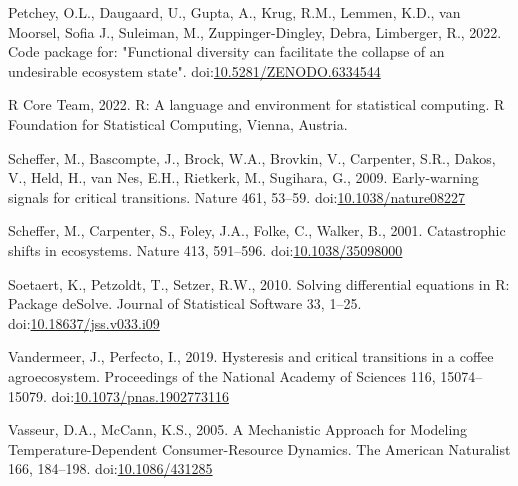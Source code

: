 \documentclass[
]{article}
\newlength{\cslhangindent}
\newlength{\cslentryspacingunit} %
\newenvironment{CSLReferences}[2] %
 {%
  \setlength{\parindent}{0pt}
  \ifodd #1
  \let\oldpar\par
  \def\par{\hangindent=\cslhangindent\oldpar}
  \fi
  \setlength{\parskip}{#2\cslentryspacingunit}
 }%
 {}
\begin{document}
\begin{CSLReferences}{1}{0}
\leavevmode{}%
Petchey, O.L., Daugaard, U., Gupta, A., Krug, R.M., Lemmen, K.D., van
Moorsel, Sofia J., Suleiman, M., Zuppinger-Dingley, Debra, Limberger,
R., 2022. Code package for: "{Functional} diversity can facilitate the
collapse of an undesirable ecosystem state".
doi:\href{https://doi.org/10.5281/ZENODO.6334544}{10.5281/ZENODO.6334544}

\leavevmode{}%
R Core Team, 2022. R: {A} language and environment for statistical
computing. {R Foundation for Statistical Computing}, {Vienna, Austria}.

\leavevmode{}%
Scheffer, M., Bascompte, J., Brock, W.A., Brovkin, V., Carpenter, S.R.,
Dakos, V., Held, H., van Nes, E.H., Rietkerk, M., Sugihara, G., 2009.
Early-warning signals for critical transitions. Nature 461, 53--59.
doi:\href{https://doi.org/10.1038/nature08227}{10.1038/nature08227}

\leavevmode{}%
Scheffer, M., Carpenter, S., Foley, J.A., Folke, C., Walker, B., 2001.
Catastrophic shifts in ecosystems. Nature 413, 591--596.
doi:\href{https://doi.org/10.1038/35098000}{10.1038/35098000}

\leavevmode{}%
Soetaert, K., Petzoldt, T., Setzer, R.W., 2010. Solving differential
equations in {R}: {Package deSolve}. Journal of Statistical Software 33,
1--25.
doi:\href{https://doi.org/10.18637/jss.v033.i09}{10.18637/jss.v033.i09}

\leavevmode{}%
Vandermeer, J., Perfecto, I., 2019. Hysteresis and critical transitions
in a coffee agroecosystem. Proceedings of the National Academy of
Sciences 116, 15074--15079.
doi:\href{https://doi.org/10.1073/pnas.1902773116}{10.1073/pnas.1902773116}

\leavevmode{}%
Vasseur, D.A., McCann, K.S., 2005. A {Mechanistic Approach} for
{Modeling Temperature}-{Dependent Consumer}-{Resource Dynamics}. The
American Naturalist 166, 184--198.
doi:\href{https://doi.org/10.1086/431285}{10.1086/431285}

\end{CSLReferences}
\end{document}
